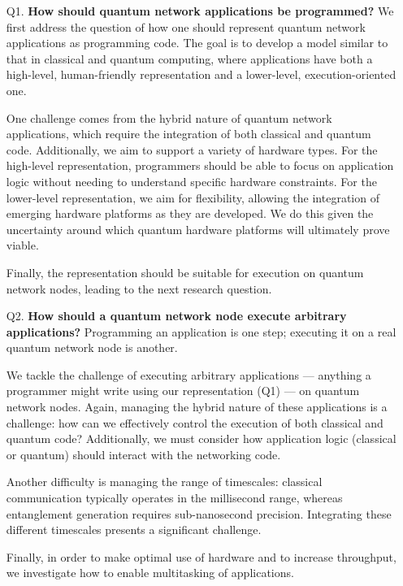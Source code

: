 \begin{itemize}
  \item[Q1.] \textbf{How should quantum network applications be programmed?}
    We first address the question of how one should represent quantum network applications as programming code.
    The goal is to develop a model similar to that in classical and quantum computing, where applications have both a high-level, human-friendly representation and a lower-level, execution-oriented one.

    One challenge comes from the hybrid nature of quantum network applications, which require the integration of both classical and quantum code.
    Additionally, we aim to support a variety of hardware types.
    For the high-level representation, programmers should be able to focus on application logic without needing to understand specific hardware constraints.
    For the lower-level representation, we aim for flexibility, allowing the integration of emerging hardware platforms as they are developed.
    We do this given the uncertainty around which quantum hardware platforms will ultimately prove viable.

    Finally, the representation should be suitable for execution on quantum network nodes, leading to the next research question.

  \item[Q2.] \textbf{How should a quantum network node execute arbitrary applications?}
    Programming an application is one step; executing it on a real quantum network node is another.

    We tackle the challenge of executing arbitrary applications --- anything a programmer might write using our representation (Q1) --- on quantum network nodes.
    Again, managing the hybrid nature of these applications is a challenge: how can we effectively control the execution of both classical and quantum code?
    Additionally, we must consider how application logic (classical or quantum) should interact with the networking code.
    
    Another difficulty is managing the range of timescales: classical communication typically operates in the millisecond range, whereas entanglement generation requires sub-nanosecond precision.
    Integrating these different timescales presents a significant challenge.

    Finally, in order to make optimal use of hardware and to increase throughput, we investigate how to enable multitasking of applications.


\end{itemize}
